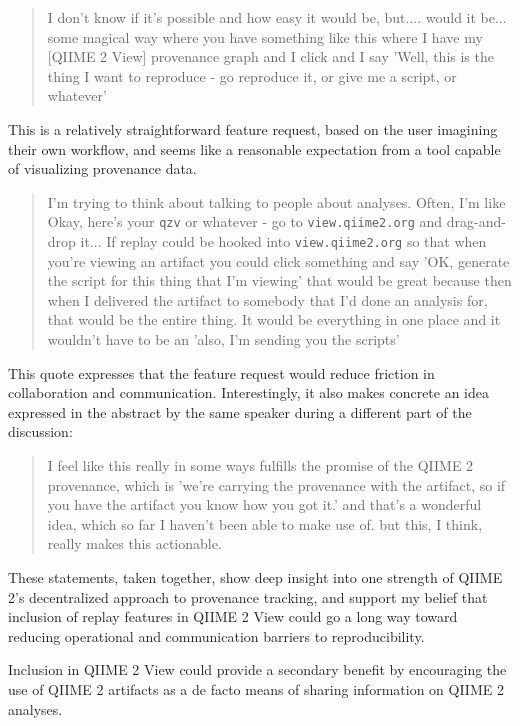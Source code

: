 \begin{quote}
I don't know if it's possible and how easy it would be, but.... would it be...
some magical way where you have something like this where I have my [QIIME 2 View]
provenance graph and I click and I say 'Well, this is the thing I want to
reproduce - go reproduce it, or give me a script, or whatever'
\end{quote}

\noindent This is a relatively straightforward feature request, based on the user
imagining their own workflow, and seems like a reasonable expectation from a
tool capable of visualizing provenance data.

\begin{quote}
I'm trying to think about talking to people about analyses. Often, I'm like
Okay, here's your \texttt{qzv} or whatever - go to \texttt{view.qiime2.org} and drag-and-drop
it... If replay could be hooked into \texttt{view.qiime2.org} so that when you're viewing
an artifact you could click something and say 'OK, generate the script for this
thing that I'm viewing' that would be great because then when I delivered the
artifact to somebody that I'd done an analysis for, that would be the entire
thing. It would be everything in one place and it wouldn't have to be an 'also,
I'm sending you the scripts'
\end{quote}

\noindent This quote expresses that the feature request would reduce friction in
collaboration and communication. Interestingly, it also makes concrete an idea
expressed in the abstract by the same speaker during a different part of the
discussion:

\begin{quote}
I feel like this really in some ways fulfills the promise of the QIIME 2
provenance, which is 'we're carrying the provenance with the artifact, so if you
have the artifact you know how you got it.' and that's a wonderful idea, which
so far I haven't been able to make use of. but this, I think, really makes this
actionable.
\end{quote}

\noindent These statements, taken together, show deep insight into one strength of QIIME
2’s decentralized approach to provenance tracking, and support my belief that
inclusion of replay features in QIIME 2 View could go a long way toward reducing
operational and communication barriers to reproducibility. 

Inclusion in QIIME 2 View could provide a secondary benefit by encouraging the use of
QIIME 2 artifacts as a de facto means of sharing information on QIIME 2 analyses.

